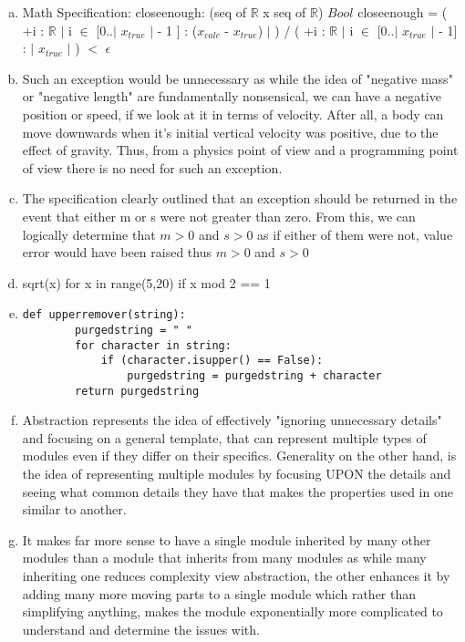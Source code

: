 \documentclass[12pt]{article}
\begin{document}
\begin{enumerate}[a)]
\item
Math Specification:
\medskip
closeenough: (seq of $\mathbb{R}$ x seq of $\mathbb{R}$) \rightarrow $Bool$ 
\medskip
closeenough = ( +i : $\mathbb{R}$ $|$ i $\in$ [0..$|$ $x_{true}$ $|$ - 1 ] : ($x_{calc}$ - $x_{true}$) $|$ ) / ( +i : $\mathbb{R}$ $|$ i $\in$ [0..$|$ $x_{true}$ $|$ - 1] : $|$ $x_{true}$ $|$ ) $<$ $\epsilon$
\item Such an exception would be unnecessary as while the idea of "negative mass" or "negative length" are fundamentally nonsensical, we can have a negative position or speed, if we look at it in terms of velocity. After all, a body can move downwards when it's initial vertical velocity was positive, due to the effect of gravity. Thus, from a physics point of view and a programming point of view there is no need for such an exception.
\item The specification clearly outlined that an exception should be returned in the event that either m or s were not greater than zero. From this, we can logically determine that $m > 0$ and $s > 0$ as if either of them were not, value error would have been raised thus $m > 0$ and $s > 0$
\item sqrt(x) for x in range(5,20) if x mod 2 == 1
\item 
\begin{verbatim}
def upperremover(string): 
        purgedstring = " " 
        for character in string: 
            if (character.isupper() == False): 
                purgedstring = purgedstring + character 
        return purgedstring 
\end{verbatim}                
\item Abstraction represents the idea of effectively "ignoring unnecessary details" and focusing on a general template, that can represent multiple types of modules even if they differ on their specifics. Generality on the other hand, is the idea of representing multiple modules by focusing UPON the details and seeing what common details they have that makes the properties used in one similar to another.
\item It makes far more sense to have a single module inherited by many other modules than a module that inherits from many modules as while many inheriting one reduces complexity view abstraction, the other enhances it by adding many more moving parts to a single module which rather than simplifying anything, makes the module exponentially more complicated to understand and determine the issues with.
\end{enumerate}
\newpage
\lstset{language=Python, basicstyle=\tiny, breaklines=true, showspaces=false,
  showstringspaces=false, breakatwhitespace=true}
\def\thesection{\Alph{section}}
\end{document}

